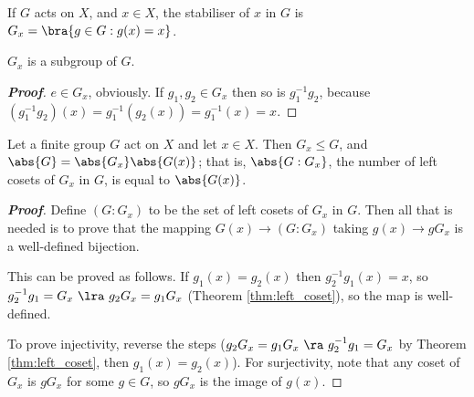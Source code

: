
\begin{definition}[stabiliser]
If $G$ acts on $X$, and $x\in X$, the stabiliser of $x$ in $G$ is $G_x=\bra{g\in G:g(x)=x}$.
\end{definition}

\begin{lemma}\label{lem:stabiliser_subgroup}
$G_x$ is a subgroup of $G$.
\end{lemma}

\begin{proof}[\bf Proof]
$e\in G_x$, obviously. If $g_1,g_2\in G_x$ then so is $g_1^{-1}g_2$, because $(g_1^{-1}g_2)(x) = g_1^{-1}(g_2(x)) = g_1^{-1}(x) =x$.
\end{proof}


\begin{theorem}\label{thm:orbit_stabiliser}
Let a finite group $G$ act on $X$ and let $x\in X$. Then $G_x\leq G$, and $\abs{G} = \abs{G_x}\abs{G(x)}$; that is, $\abs{G:G_x}$, the number of left cosets of $G_x$ in $G$, is equal to $\abs{G(x)}$.
\end{theorem}

\begin{proof}[\bf Proof]
Define $(G:G_x)$ to be the set of left cosets of $G_x$ in $G$. Then all that is needed is to prove that the mapping $G(x)\to (G:G_x)$ taking $g(x) \to gG_x$ is a well-defined bijection.

This can be proved as follows. If $g_1(x) = g_2(x)$ then $g_2^{-1} g_1 (x) = x$, so $g_2^{-1}g_1 = G_x \ \lra \ g_2G_x = g_1 G_x$ (Theorem \ref{thm:left_coset}), so the map is well-defined.

To prove injectivity, reverse the steps ($g_2G_x = g_1 G_x \ \ra \ g_2^{-1}g_1 = G_x$ by Theorem \ref{thm:left_coset}, then $g_1(x) = g_2(x)$). For surjectivity, note that any coset of $G_x$ is $gG_x$ for some $g\in G$, so $gG_x$ is the image of $g(x)$.
\end{proof}


